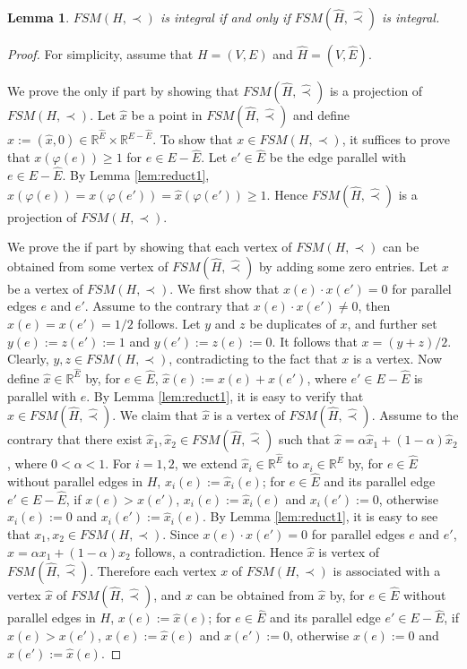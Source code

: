 \documentclass[11pt]{article}
\newtheorem{lemma}[theorem]{Lemma}
\numberwithin{theorem}{section}
\begin{document}
\begin{lemma}
\label{lem:reduct4}
$FSM(H,\prec)$ is integral if and only if $FSM(\hat{H},\hat\prec)$ is integral.
\end{lemma}
\begin{proof}
For simplicity, assume that $H=(V,E)$ and $\hat{H}=(V,\hat{E})$.

We prove the only if part by showing that $FSM(\hat{H},\hat\prec)$ is a projection of $FSM(H,\prec)$. 
Let $\hat{x}$ be a point in $FSM(\hat{H},\hat\prec)$ and define $x:=(\hat{x},0)\in \mathbb{R}^{\hat{E}}\times \mathbb{R}^{E-\hat{E}}$. To show that $x\in FSM(H,\prec)$, it suffices to prove that $x(\varphi(e))\geq 1$ for $e\in E-\hat{E}$. Let $e'\in \hat{E}$ be the edge parallel with $e\in E-\hat{E}$. By Lemma \ref{lem:reduct1}, $x(\varphi(e))=x(\varphi(e'))=\hat{x}(\varphi(e'))\geq 1$. Hence $FSM(\hat{H},\hat\prec)$ is a projection of $FSM(H,\prec)$.

We prove the if part by showing that each vertex of $FSM(H,\prec)$ can be obtained from some vertex of $FSM(\hat{H},\hat\prec)$ by adding some zero entries.
Let $x$ be a vertex of $FSM(H,\prec)$.
We first show that $x(e)\cdot x(e')=0$ for parallel edges $e$ and $e'$. 
Assume to the contrary that $x(e)\cdot x(e')\not=0$, then $x(e)=x(e')=1/2$ follows. Let $y$ and $z$ be duplicates of $x$, and further set $y (e):=z(e'):=1$ and $y (e'):=z(e):=0$. It follows that $x= (y + z)/2$. Clearly, $y,z\in FSM(H,\prec)$, contradicting to the fact that $x$ is a vertex.
Now define $\hat{x}\in \mathbb{R}^{\hat{E}}$ by, for $e\in \hat{E}$, $\hat{x}(e):=x(e)+x(e')$, where $e'\in E-\hat{E}$ is parallel with $e$. By Lemma \ref{lem:reduct1}, it is easy to verify that $\hat{x}\in FSM(\hat{H},\hat\prec)$. We claim that $\hat{x}$ is a vertex of $FSM(\hat{H},\hat\prec)$. Assume to the contrary that there exist $\hat{x}_1, \hat{x}_2 \in FSM(\hat{H},\hat\prec)$ such that $\hat{x}=\alpha \hat{x}_1+ (1-\alpha)\hat{x}_2$, where $0<\alpha<1$. For $i=1,2$, we extend $\hat{x}_i\in \mathbb{R}^{\hat{E}}$ to $x_i\in \mathbb{R}^{E}$ by, for $e\in \hat{E}$ without parallel edges in $H$, $x_i(e):=\hat{x}_i(e)$; for $e\in\hat{E}$ and its parallel edge $e'\in E-\hat{E}$, if $x(e)>x(e')$, $x_i(e):=\hat{x}_i(e)$ and $x_i(e'):=0$, otherwise $x_i(e):=0$ and $x_i(e'):=\hat{x}_i(e)$. By Lemma \ref{lem:reduct1}, it is easy to see that $x_1,x_2\in FSM(H,\prec)$. 
Since $x(e)\cdot x(e')=0$ for parallel edges $e$ and $e'$, $x=\alpha x_1+(1-\alpha) x_2$ follows, a contradiction. Hence $\hat{x}$ is vertex of $FSM(\hat{H},\hat\prec)$. Therefore each vertex $x$ of $FSM(H,\prec)$ is associated with a vertex $\hat{x}$ of $FSM(\hat{H},\hat\prec)$, and $x$ can be obtained from $\hat{x}$ by, for $e\in \hat{E}$ without parallel edges in $H$, $x(e):=\hat{x}(e)$; for $e\in\hat{E}$ and its parallel edge $e'\in E-\hat{E}$, if $x(e)>x(e')$, $x(e):=\hat{x}(e)$ and $x(e'):=0$, otherwise $x(e):=0$ and $x(e'):=\hat{x}(e)$. 
\end{proof}
\end{document}
